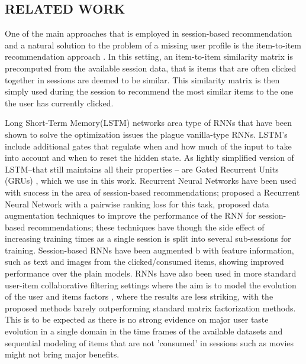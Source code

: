 \subsection{RELATED WORK}
One of the main approaches that is employed in session-based recommendation and a natural solution to the problem of a missing user proﬁle is the item-to-item recommendation approach \cite{sarwar2001item}. In this setting, an item-to-item similarity matrix is precomputed from the available session data, that is items that are often clicked together in sessions are deemed to be similar. This similarity matrix is then simply used during the session to recommend the most similar items to the one the user has currently clicked. 

Long Short-Term Memory(LSTM) \cite{hochreiter1997long} networks area type of RNNs that have been shown to solve the optimization issues the plague vanilla-type RNNs. LSTM’s include additional gates that regulate when and how much of the input to take into account and when to reset the hidden state. As lightly simpliﬁed version of LSTM–that still maintains all their properties – are Gated Recurrent Units (GRUs) \cite{cho2014bv}, which we use in this work. Recurrent Neural Networks have been used with success in the area of session-based recommendations; \cite{hidasi2016a} proposed a Recurrent Neural Network with a pairwise ranking loss for this task, \cite{tan2016improved} proposed data augmentation techniques to improve the performance of the RNN for session-based recommendations; these techniques have though the side effect of increasing training times as a single session is split into several sub-sessions for training. Session-based RNNs have been augmented \cite{hidasi2016parallel} b with feature information, such as text and images from the clicked/consumed items, showing improved performance over the plain models. RNNs have also been used in more standard user-item collaborative ﬁltering settings where the aim is to model the evolution of the user and items factors \cite{wu2017recurrent},\cite{devooght2016collaborative} where the results are less striking, with the proposed methods barely outperforming standard matrix factorization methods. This is to be expected as there is no strong evidence on major user taste evolution in a single domain in the time frames of the available datasets and sequential modeling of items that are not ’consumed’ in sessions such as movies might not bring major beneﬁts. 

